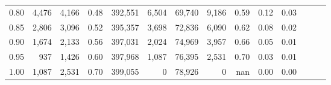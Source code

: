 \begin{tabular}{rrrrrrrrrrrrrr}
0.80 &   4,476 &  4,166 &  0.48 &  392,551 &    6,504 &  69,740 &   9,186 &  0.59 &  0.12 &      0.03 \\
0.85 &   2,806 &  3,096 &  0.52 &  395,357 &    3,698 &  72,836 &   6,090 &  0.62 &  0.08 &      0.02 \\
0.90 &   1,674 &  2,133 &  0.56 &  397,031 &    2,024 &  74,969 &   3,957 &  0.66 &  0.05 &      0.01 \\
0.95 &     937 &  1,426 &  0.60 &  397,968 &    1,087 &  76,395 &   2,531 &  0.70 &  0.03 &      0.01 \\
1.00 &   1,087 &  2,531 &  0.70 &  399,055 &        0 &  78,926 &       0 &   nan &  0.00 &      0.00 \\
\bottomrule
\end{tabular}
